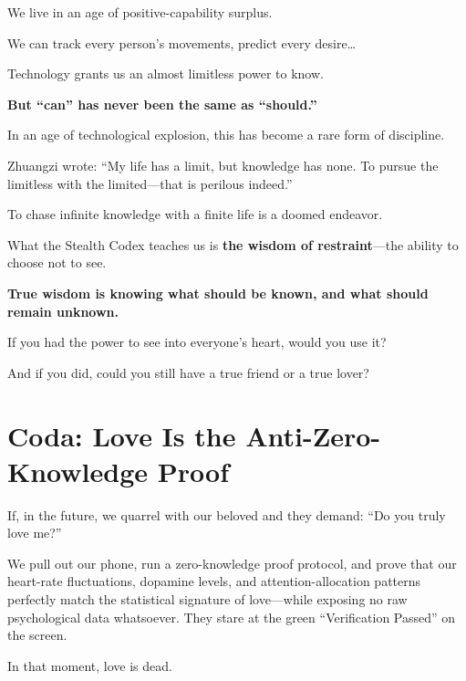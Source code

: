 \vspace{1em}

We live in an age of positive-capability surplus.

We can track every person's movements, predict every desire\ldots

Technology grants us an almost limitless power to know.

\textbf{But ``can'' has never been the same as ``should.''}

In an age of technological explosion, this has become a rare form of discipline.

\vspace{1em}

Zhuangzi wrote: ``My life has a limit, but knowledge has none. To pursue the limitless with the limited---that is perilous indeed.''

To chase infinite knowledge with a finite life is a doomed endeavor.

What the Stealth Codex teaches us is \textbf{the wisdom of restraint}---the ability to choose not to see.

\textbf{True wisdom is knowing what should be known, and what should remain unknown.}

\begin{thinkbox}[Reflection]
If you had the power to see into everyone's heart, would you use it?

And if you did, could you still have a true friend or a true lover?
\end{thinkbox}

\newpage
\section{Coda: Love Is the Anti-Zero-Knowledge Proof}

If, in the future, we quarrel with our beloved and they demand: ``Do you truly love me?''

We pull out our phone, run a zero-knowledge proof protocol, and prove that our heart-rate fluctuations, dopamine levels, and attention-allocation patterns perfectly match the statistical signature of love---while exposing no raw psychological data whatsoever.
They stare at the green ``Verification Passed'' on the screen.

In that moment, love is dead.

\vspace{1em}

